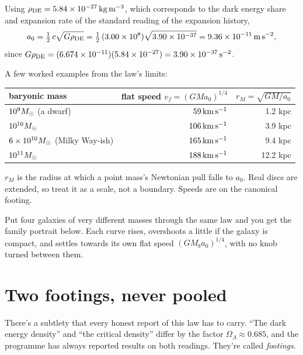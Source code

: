 Using $\rho_{\rm DE}=5.84\times10^{-27}\,\mathrm{kg\,m^{-3}}$, which corresponds to the dark energy share and expansion rate of the standard reading of the expansion history,
\begin{equation}
a_0=\tfrac12\,c\sqrt{G\rho_{\rm DE}}=\tfrac12\,(3.00\times10^8)\sqrt{3.90\times10^{-37}}=9.36\times10^{-11}\,\mathrm{m\,s^{-2}},
\end{equation}
since $G\rho_{\rm DE}=(6.674\times10^{-11})(5.84\times10^{-27})=3.90\times10^{-37}\,\mathrm{s^{-2}}$.

A few worked examples from the law's limits:
\begin{center}
\begin{tabular}{lrr}
\toprule
baryonic mass & flat speed $v_f=(GMa_0)^{1/4}$ & $r_M=\sqrt{GM/a_0}$\\
\midrule
$10^9M_\odot$ (a dwarf) & $59\,\mathrm{km\,s^{-1}}$ & 1.2 kpc\\
$10^{10}M_\odot$ & $106\,\mathrm{km\,s^{-1}}$ & 3.9 kpc\\
$6\times10^{10}M_\odot$ (Milky Way-ish) & $165\,\mathrm{km\,s^{-1}}$ & 9.4 kpc\\
$10^{11}M_\odot$ & $188\,\mathrm{km\,s^{-1}}$ & 12.2 kpc\\
\bottomrule
\end{tabular}

\smallskip
{\footnotesize $r_M$ is the radius at which a point mass's Newtonian pull falls to $a_0$. Real discs are extended, so treat it as a scale, not a boundary. Speeds are on the canonical footing.}
\end{center}

Put four galaxies of very different masses through the same law and you get the family portrait below. Each curve rises, overshoots a little if the galaxy is compact, and settles towards its own flat speed $(GM_ba_0)^{1/4}$, with no knob turned between them.





\section{Two footings, never pooled}

There's a subtlety that every honest report of this law has to carry. ``The dark energy density'' and ``the critical density'' differ by the factor $\Omega_\Lambda\approx0.685$, and the programme has always reported results on both readings. They're called \emph{footings}.

